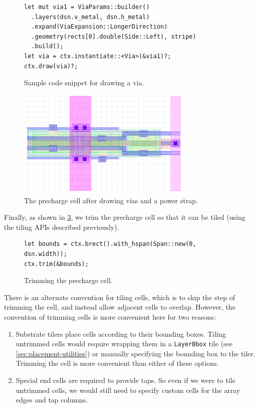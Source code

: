 \begin{figure}[H] \centering
\begin{verbatim}
let mut via1 = ViaParams::builder()
  .layers(dsn.v_metal, dsn.h_metal)
  .expand(ViaExpansion::LongerDirection)
  .geometry(rects[0].double(Side::Left), stripe)
  .build();
let via = ctx.instantiate::<Via>(&via1)?;
ctx.draw(via)?;
\end{verbatim}
\caption{
Sample code snippet for drawing a via.
\label{fig:sample-via-code}
}
\end{figure}

\begin{figure}[H] \centering
\includegraphics[width=0.75\textwidth]{figures/precharge_vias.png}
\caption{The precharge cell after drawing vias and a power strap. \label{fig:precharge-vias}}
\end{figure}


Finally, as shown in \ref{fig:precharge-trimmed}, we trim the precharge cell so that it can be tiled (using the tiling APIs described previously).

\begin{figure}[H] \centering
\begin{verbatim}
let bounds = ctx.brect().with_hspan(Span::new(0, dsn.width));
ctx.trim(&bounds);
\end{verbatim}
\caption{Trimming the precharge cell. \label{fig:precharge-trimmed}}
\end{figure}

There is an alternate convention for tiling cells, which is to skip the step of trimming the cell, and instead
allow adjacent cells to overlap. However, the convention of trimming cells is more convenient here for two reasons:
\begin{enumerate}
\item Substrate tilers place cells according to their bounding boxes. Tiling untrimmed cells would require wrapping them
  in a \verb|LayerBbox| tile (see \ref{sec:placement-utilities}) or manually specifying the bounding box to the tiler. Trimming the cell is more convenient than
  either of these options.
\item Special end cells are required to provide taps. So even if we were to tile untrimmed cells, we would still need to specify custom cells for
  the array edges and tap columns.
\end{enumerate}

